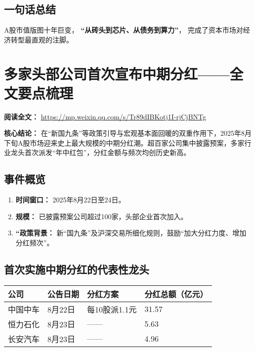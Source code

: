 \subsection{一句话总结}
A股市值版图十年巨变，  
\textbf{“从砖头到芯片、从债务到算力”}，  
完成了资本市场对经济转型最直观的注脚。  




\section{多家头部公司首次宣布中期分红——全文要点梳理}

\vspace{1cm}
\noindent\textbf{阅读全文：} \url{https://mp.weixin.qq.com/s/Tr89dIBKotj1I-rjCjBNTg}

\textbf{核心结论：}  
在“新国九条”等政策引导与宏观基本面回暖的双重作用下，2025年8月下旬A股市场迎来史上最大规模的中期分红潮。超百家公司集中披露预案，多家行业龙头首次派发“年中红包”，分红金额与频次均创历史新高。

\subsection{事件概览}
\begin{enumerate}[leftmargin=*, nosep]
    \item \textbf{时间窗口：} 2025年8月22日至24日。
    \item \textbf{规模：} 已披露预案公司超过100家，头部企业首次加入。
    \item \textbf{“政策背景：} 新“国九条”及沪深交易所细化规则，鼓励“加大分红力度、增加分红频次”。
\end{enumerate}

\subsection{首次实施中期分红的代表性龙头}
\begin{longtable}{@{}llll@{}}
\toprule
公司 & 公告日期 & 分红方案 & 分红总额（亿元） \\ \midrule
中国中车 & 8月22日 & 每10股派1.1元 & 31.57 \\
恒力石化 & 8月23日 & —— & 5.63 \\
长安汽车 & 8月23日 & —— & 4.96 \\ \bottomrule
\end{longtable}

